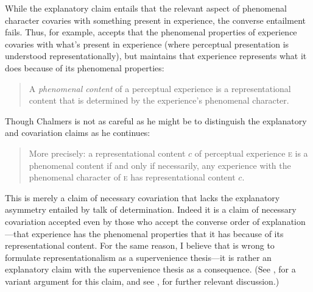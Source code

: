 \documentclass[12pt]{article}
\begin{document}
While the explanatory claim entails that the relevant aspect of phenomenal character covaries with something present in experience, the converse entailment fails. Thus, for example, \citet{Chalmers:2006kx} accepts that the phenomenal properties of experience covaries with what's present in experience (where perceptual presentation is understood representationally), but maintains that experience represents what it does because of its phenomenal properties: 
\begin{quote}
	A \emph{phenomenal content} of a perceptual experience is a representational content that is determined by the experience's phenomenal character. \citep[50]{Chalmers:2006kx} 
\end{quote}
Though Chalmers is not as careful as he might be to distinguish the explanatory and covariation claims as he continues: 
\begin{quote}
	More precisely: a representational content $c$ of perceptual experience \textsc{e} is a phenomenal content if and only if necessarily, any experience with the phenomenal character of \textsc{e} has representational content $c$. \citep[50]{Chalmers:2006kx} 
\end{quote}
This is merely a claim of necessary covariation that lacks the explanatory asymmetry entailed by talk of determination. Indeed it is a claim of necessary covariation accepted even by those who accept the converse order of explanation---that experience has the phenomenal properties that it has because of its representational content. For the same reason, I believe that \citet{Byrne:2001dq} is wrong to formulate representationalism as a supervenience thesis---it is rather an explanatory claim with the supervenience thesis as a consequence. (See \citealp{Hilbert:2000on}, for a variant argument for this claim, and see \citealp{Martin:2002cr}, for further relevant discussion.)

\end{document}
